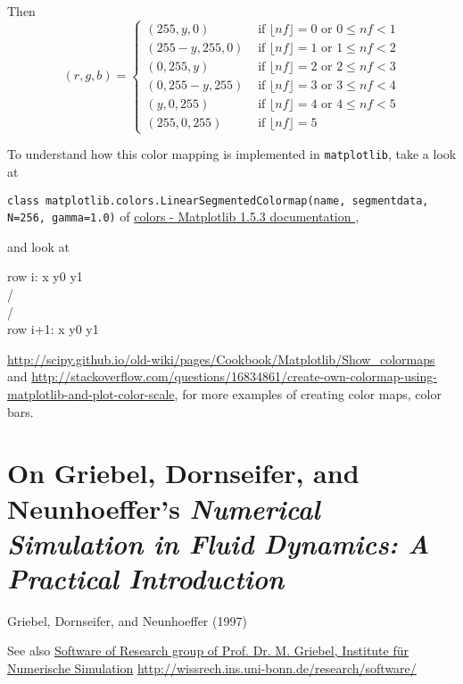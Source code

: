 \documentclass[10pt]{amsart}
\begin{document}
\begin{multicols*}{2}
Then
\begin{equation}
  (r,g,b) = \begin{cases}
    (255, y,0) & \text{ if } \lfloor nf \rfloor = 0 \text{ or } 0 \leq nf < 1   \\
    (255-y, 255,0) & \text{ if } \lfloor nf \rfloor = 1 \text{ or } 1 \leq nf < 2   \\
    (0, 255,y) & \text{ if } \lfloor nf \rfloor = 2 \text{ or } 2 \leq nf < 3   \\
    (0, 255-y,255) & \text{ if } \lfloor nf \rfloor = 3 \text{ or } 3 \leq nf < 4   \\
    (y, 0,255) & \text{ if } \lfloor nf \rfloor = 4 \text{ or } 4 \leq nf < 5   \\
    (255, 0,255) & \text{ if } \lfloor nf \rfloor = 5    \end{cases}
  \end{equation}

To understand how this color mapping is implemented in \verb|matplotlib|, take a look at

\verb|class matplotlib.colors.LinearSegmentedColormap(name, segmentdata, N=256, gamma=1.0)| of \href{http://matplotlib.org/api/colors_api.html}{colors - Matplotlib 1.5.3 documentation },

and look at

row i:   x  y0  y1       \\
               /         \\
              /          \\
row i+1: x  y0  y1

\url{http://scipy.github.io/old-wiki/pages/Cookbook/Matplotlib/Show_colormaps} and \url{http://stackoverflow.com/questions/16834861/create-own-colormap-using-matplotlib-and-plot-color-scale}, for more examples of creating color maps, color bars.  

\section{On Griebel, Dornseifer, and Neunhoeffer's \emph{Numerical Simulation in Fluid Dynamics: A Practical Introduction}}

Griebel, Dornseifer, and Neunhoeffer (1997) \cite{GDN1997}

See also \href{http://wissrech.ins.uni-bonn.de/research/software/}{Software of Research group of Prof. Dr. M. Griebel, Institute f\"{u}r Numerische Simulation} \url{http://wissrech.ins.uni-bonn.de/research/software/}



\end{multicols*}
\end{document}
